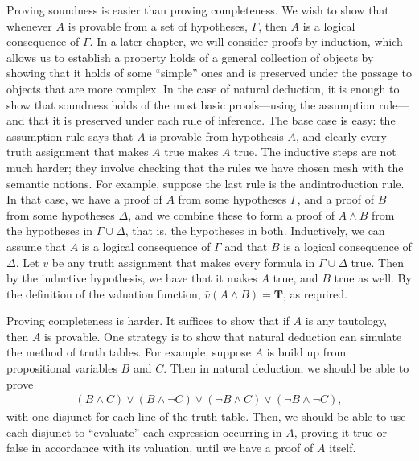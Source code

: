 \documentclass[letterpaper,10pt,english]{sphinxmanual}
\begin{document}
\sphinxAtStartPar
Proving soundness is easier than proving completeness. We wish to show that whenever \(A\) is provable from a set of hypotheses, \(\Gamma\), then \(A\) is a logical consequence of \(\Gamma\). In a later chapter, we will consider proofs by induction, which allows us to establish a property holds of a general collection of objects by showing that it holds of some “simple” ones and is preserved under the passage to objects that are more complex. In the case of natural deduction, it is enough to show that soundness holds of the most basic proofs—using the assumption rule—and that it is preserved under each rule of inference. The base case is easy: the assumption rule says that \(A\) is provable from hypothesis \(A\), and clearly every truth assignment that makes \(A\) true makes \(A\) true. The inductive steps are not much harder; they involve checking that the rules we have chosen mesh with the semantic notions. For example, suppose the last rule is the and\sphinxhyphen{}introduction rule. In that case, we have a proof of \(A\) from some hypotheses \(\Gamma\), and a proof of \(B\) from some hypotheses \(\Delta\), and we combine these to form a proof of \(A \wedge B\) from the hypotheses in \(\Gamma \cup \Delta\), that is, the hypotheses in both. Inductively, we can assume that \(A\) is a logical consequence of \(\Gamma\) and that \(B\) is a logical consequence of \(\Delta\). Let \(v\) be any truth assignment that makes every formula in \(\Gamma \cup \Delta\) true. Then by the inductive hypothesis, we have that it makes \(A\) true, and \(B\) true as well. By the definition of the valuation function, \(\bar v (A \wedge B) = \mathbf{T}\), as required.

\sphinxAtStartPar
Proving completeness is harder. It suffices to show that if \(A\) is any tautology, then \(A\) is provable. One strategy is to show that natural deduction can simulate the method of truth tables. For example, suppose \(A\) is build up from propositional variables \(B\) and \(C\). Then in natural deduction, we should be able to prove
\begin{equation*}
\begin{split}(B \wedge C) \vee (B \wedge \neg C) \vee (\neg B \wedge C) \vee (\neg B \wedge \neg C),\end{split}
\end{equation*}
\sphinxAtStartPar
with one disjunct for each line of the truth table. Then, we should be able to use each disjunct to “evaluate” each expression occurring in \(A\), proving it true or false in accordance with its valuation, until we have a proof of \(A\) itself.
\end{document}
